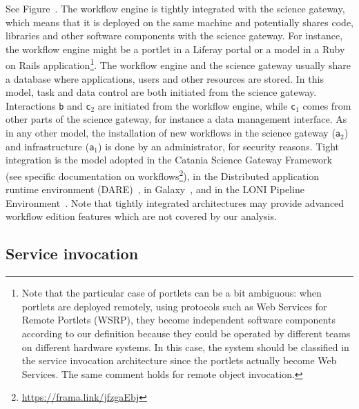 \documentclass[preprint,3p,twocolumn]{elsarticle}
\newcommand{\correction}[1]{\color{blue}#1\color{black}\xspace}
\begin{document}
See Figure~. The workflow engine is tightly
integrated with the science gateway, which means that it is deployed
on the same machine and potentially shares code, libraries and other
software components with the science gateway. For instance, the
workflow engine might be a portlet in a Liferay portal or a model in a
Ruby on Rails application\footnote{\correction{Note that the
    particular case of portlets can be a bit ambiguous: when portlets
    are deployed remotely, using protocols such as Web Services for
    Remote Portlets (WSRP), they become independent software
    components according to our definition because they could be
    operated by different teams on different hardware systems. In this
    case, the system should be classified in the service invocation
    architecture since the portlets actually become Web Services. The
    same comment holds for remote object invocation.}}. The workflow
engine and the science gateway usually share a database where
applications, users and other resources are stored.  In this model,
task and data control are both initiated from the science
gateway. Interactions \texttt{b} and \texttt{c$_2$} are initiated from
the workflow engine, while \texttt{c$_1$} comes from other parts of
the science gateway, for instance a data management interface. As in
any other model, the installation of new workflows in the science
gateway (\texttt{a$_2$}) and infrastructure (\texttt{a$_1$}) is done
by an administrator, for security reasons. \correction{Tight
  integration} is the model adopted in the Catania Science Gateway
Framework~\cite{ardizzone2012decide} (see specific documentation on
workflows\footnote{\url{https://frama.link/jfzgaEbj}}), in the
Distributed application runtime environment
(DARE)~\cite{maddineni2012distributed}, in
Galaxy~\cite{goecks2010galaxy}, and in the LONI Pipeline
Environment~\cite{dinov2009efficient}. Note that tightly integrated
architectures may provide advanced workflow edition features which are
not covered by our analysis.

\subsection{Service invocation}
\end{document}
